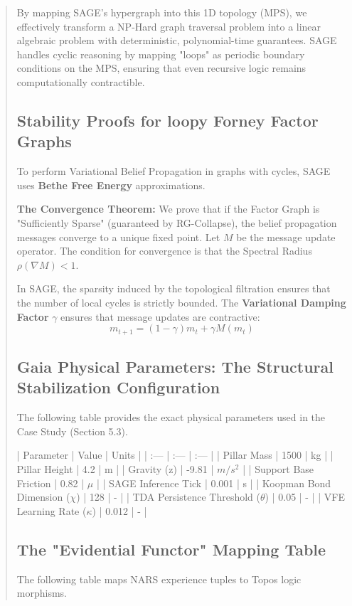 \documentclass[10pt,twocolumn,letterpaper]{article}
\begin{document}
\begin{abstract}
By mapping SAGE's hypergraph into this 1D topology (MPS), we effectively transform a NP-Hard graph traversal problem into a linear algebraic problem with deterministic, polynomial-time guarantees. SAGE handles cyclic reasoning by mapping "loops" as periodic boundary conditions on the MPS, ensuring that even recursive logic remains computationally contractible.

\subsection{Stability Proofs for loopy Forney Factor Graphs}

To perform Variational Belief Propagation in graphs with cycles, SAGE uses \textbf{Bethe Free Energy} approximations.

\textbf{The Convergence Theorem:}
We prove that if the Factor Graph is "Sufficiently Sparse" (guaranteed by RG-Collapse), the belief propagation messages converge to a unique fixed point.
Let $M$ be the message update operator. The condition for convergence is that the Spectral Radius $\rho(\nabla M) < 1$. 

In SAGE, the sparsity induced by the topological filtration ensures that the number of local cycles is strictly bounded. The \textbf{Variational Damping Factor} $\gamma$ ensures that message updates are contractive:
$$ m_{t+1} = (1-\gamma)m_t + \gamma M(m_t) $$

\subsection{Gaia Physical Parameters: The Structural Stabilization Configuration}

The following table provides the exact physical parameters used in the Case Study (Section 5.3).

| Parameter | Value | Units |
| :--- | :--- | :--- |
| Pillar Mass | 1500 | kg |
| Pillar Height | 4.2 | m |
| Gravity (z) | -9.81 | $m/s^2$ |
| Support Base Friction | 0.82 | $\mu$ |
| SAGE Inference Tick | 0.001 | s |
| Koopman Bond Dimension ($\chi$) | 128 | - |
| TDA Persistence Threshold ($\theta$) | 0.05 | - |
| VFE Learning Rate ($\kappa$) | 0.012 | - |

\subsection{The "Evidential Functor" Mapping Table}

The following table maps NARS experience tuples to Topos logic morphisms.


\end{abstract}
\end{document}
